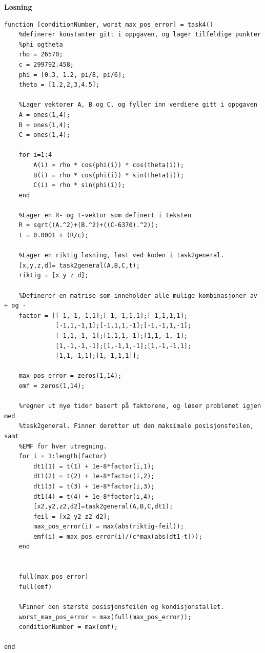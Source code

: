 \textbf{Løsning}

\begin{lstlisting}[caption={task4.m},label=lst:task4.m]
function [conditionNumber, worst_max_pos_error] = task4()
	%definerer konstanter gitt i oppgaven, og lager tilfeldige punkter 
	%phi ogtheta
	rho = 26570;
	c = 299792.458;
	phi = [0.3, 1.2, pi/8, pi/6];
	theta = [1.2,2,3,4.5];

	%Lager vektorer A, B og C, og fyller inn verdiene gitt i oppgaven
	A = ones(1,4); 
	B = ones(1,4); 
	C = ones(1,4);

	for i=1:4
	    A(i) = rho * cos(phi(i)) * cos(theta(i));
	    B(i) = rho * cos(phi(i)) * sin(theta(i));
	    C(i) = rho * sin(phi(i));
	end

	%Lager en R- og t-vektor som definert i teksten
	R = sqrt((A.^2)+(B.^2)+((C-6370).^2));
	t = 0.0001 + (R/c);

	%Lager en riktig løsning, løst ved koden i task2general. 
	[x,y,z,d]= task2general(A,B,C,t); 
	riktig = [x y z d];

	%Definerer en matrise som inneholder alle mulige kombinasjoner av + og - 
	factor = [[-1,-1,-1,1];[-1,-1,1,1];[-1,1,1,1];
			  [-1,1,-1,1];[-1,1,1,-1];[-1,-1,1,-1];
			  [-1,1,-1,-1];[1,1,1,-1];[1,1,-1,-1];
			  [1,-1,-1,-1];[1,-1,1,-1];[1,-1,-1,1];
			  [1,1,-1,1];[1,-1,1,1]];

	max_pos_error = zeros(1,14);
	emf = zeros(1,14);

	%regner ut nye tider basert på faktorene, og løser problemet igjen med
	%task2general. Finner deretter ut den maksimale posisjonsfeilen, samt 
	%EMF for hver utregning.
	for i = 1:length(factor)
	    dt1(1) = t(1) + 1e-8*factor(i,1);
	    dt1(2) = t(2) + 1e-8*factor(i,2);
	    dt1(3) = t(3) + 1e-8*factor(i,3);
	    dt1(4) = t(4) + 1e-8*factor(i,4); 
	    [x2,y2,z2,d2]=task2general(A,B,C,dt1);
	    feil = [x2 y2 z2 d2];
	    max_pos_error(i) = max(abs(riktig-feil));
	    emf(i) = max_pos_error(i)/(c*max(abs(dt1-t)));
	end


	full(max_pos_error)
	full(emf)

	%Finner den største posisjonsfeilen og kondisjonstallet.
	worst_max_pos_error = max(full(max_pos_error));
	conditionNumber = max(emf);

end
\end{lstlisting}

